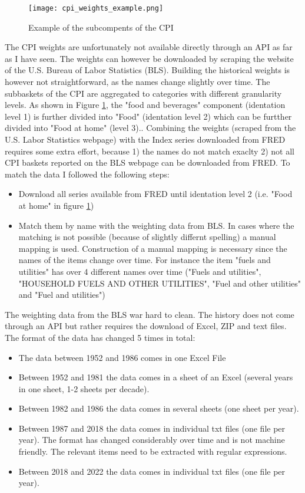 \documentclass[12pt]{article}
\begin{document}
\begin{figure}[h]
    \centering
    \texttt{[image: cpi\_weights\_example.png]}
    \caption{Example of the subcompents of the CPI}
    \label{fig:cpisub}
\end{figure}

The CPI weights are unfortunately not available directly through an API as far as I have seen. The weights can however be downloaded by scraping the website of the U.S. Bureau of Labor Statistics (BLS). Building the historical weights is however not straightforward, as the names change slightly over time. 
The subbaskets of the CPI are aggregated to categories with different granularity levels. As shown in Figure \ref{fig:cpisub}, the "food and beverages" component (identation level 1) is further divided into "Food" (identation level 2) which can be furtther divided into "Food at home" (level 3)..
Combining the weights (scraped from the U.S. Labor Statistics webpage) with the Index series downloaded from FRED requires some extra effort, because 1) the names do not match exaclty  2) not all CPI baskets reported on the BLS webpage can be downloaded from FRED. 
To match the data I followed the following steps:
\begin{itemize}
\item Download all series available from FRED until identation level 2 (i.e. "Food at home" in figure \ref{fig:cpisub})
\item Match them by name with the weighting data from BLS. In cases where the matching is not possible (because of slightly differnt spelling) a manual mapping is used. Construction of a manual mapping is necessary since the names of the items change over time. 
For instance the item "fuels and utilities" has over 4 different names over time ("Fuels and utilities", "HOUSEHOLD FUELS AND OTHER UTILITIES", "Fuel and other utilities" and "Fuel and utilities")
\end{itemize}
The weighting data from the BLS war hard to clean. The history does not come through an API but rather requires the download of Excel, ZIP and text files. The format of the data has changed 5 times in total:
\begin{itemize}
\item The data between 1952 and 1986 comes in one Excel File
\item Between 1952 and 1981 the data comes  in a sheet of an Excel (several years in one sheet, 1-2 sheets per decade).
\item Between 1982 and 1986 the data comes in several sheets (one sheet per year).
\item Between 1987 and 2018  the data comes in individual txt files (one file per year). The format has changed considerably over time and is not machine friendly. The relevant items need to be extracted with regular expressions.
\item Between 2018 and 2022 the data comes in individual txt files (one file per year). 
\end{itemize}
\end{document}
